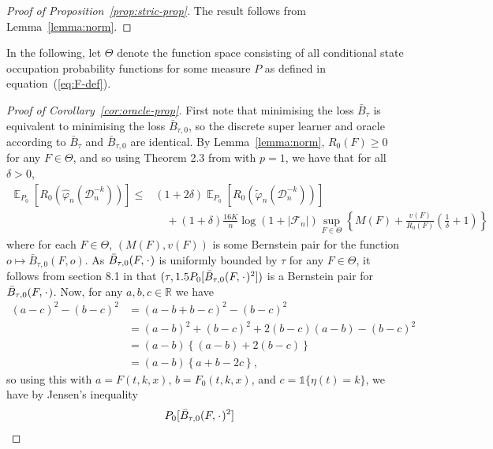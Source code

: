 \documentclass{statsoc}
\numberwithin{theorem}{section}
\DeclareMathOperator{\E}{\mathbb{E}} %
\newcommand{\R}{\mathbb{R}}
\newcommand{\blank}{\makebox[1ex]{\textbf{$\cdot$}}}
\renewcommand{\phi}{\varphi}
\newcommand{\1}{\mathds{1}}
\newcommand{\data}{\ensuremath{\mathcal{D}}}
\begin{document}
\begin{proof}[Proof of Proposition~\ref{prop:stric-prop}]
  The result follows from Lemma~\ref{lemma:norm}.
\end{proof}

In the following, let $\Theta$ denote the function space consisting of all
conditional state occupation probability functions for some measure \( P \) as
defined in equation~(\ref{eq:F-def}).

\begin{proof}[Proof of Corollary~\ref{cor:oracle-prop}]
  First note that minimising the loss \( \bar{B}_{\tau} \) is equivalent to
  minimising the loss \( \bar{B}_{\tau,0} \), so the discrete super learner and
  oracle according to \( \bar{B}_{\tau} \) and \( \bar{B}_{\tau,0} \) are
  identical. By Lemma~\ref{lemma:norm}, \( R_0(F) \geq 0 \) for any
  \( F \in \Theta \), and so using Theorem 2.3 from \citep{vaart2006oracle} with
  \( p=1 \), we have that for all \( \delta >0 \),
\begin{align*}
  \E_{P_0}{\left[ R_0(\hat{\phi}_n(\data_n^{-k})) \right]}
  \leq
  &(1+2\delta)\E_{P_0}{\left[ R_0(\tilde{\phi}_n(\data_n^{-k})) \right]}
  \\
  & \quad + (1+\delta) \frac{16 K}{n}
    \log(1 + |\mathcal{F}_n|)\sup_{F \in \Theta}
    \left\{
    M(F) + \frac{v(F)}{R_0(F)}
    \left(
    \frac{1}{\delta} + 1
    \right)
    \right\}
\end{align*}
where for each \( F \in \Theta \), \( (M(F), v(F)) \) is some Bernstein pair for
the function \(o \mapsto \bar{B}_{\tau,0}(F, o) \). As
\( \bar{B}_{\tau,0}(F, \blank) \) is uniformly bounded by \( \tau \) for any
\( F \in \Theta \), it follows from section 8.1 in \citep{vaart2006oracle} that
\( (\tau, 1.5 P_0{[\bar{B}_{\tau,0}(F, \blank)^2]}) \) is a Bernstein pair for
\( \bar{B}_{\tau,0}(F, \blank) \). Now, for any \( a,b,c \in \R \) we have
\begin{align*}
  (a-c)^2 - (b-c)^2
  & = (a-b+b-c)^2 - (b-c)^2
  \\
  & = (a-b)^2 + (b-c)^2 +2(b-c)(a-b) - (b-c)^2
  \\
  & = (a-b)
    \left\{
    (a-b) +  2(b-c)
    \right\}
  \\
  & = (a-b)
    \left\{
     a + b -2c
    \right\},
\end{align*}
so using this with \( a=F(t, k, x) \), \( b=F_0(t, k, x) \), and
\( c = \1{\{\eta(t) = k\}} \), we have by Jensen's inequality
\begin{align*}
  & P_0{[\bar{B}_{\tau,0}(F, \blank)^2]}

\end{align*}
\end{proof}
\end{document}
